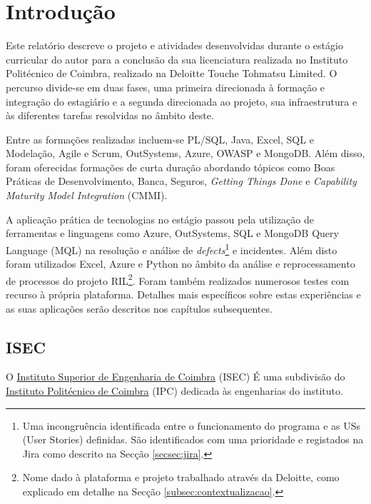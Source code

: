 \section{Introdução}\label{sec:introducao}

    Este relatório descreve o projeto e atividades desenvolvidas durante o estágio curricular do autor para a conclusão da sua licenciatura realizada no Instituto Politécnico de Coimbra, realizado na Deloitte Touche Tohmatsu Limited. O percurso divide-se em duas fases, uma primeira direcionada à formação e integração do estagiário e a segunda direcionada ao projeto, sua infraestrutura e às diferentes tarefas resolvidas no âmbito deste.

    Entre as formações realizadas incluem-se PL/SQL, Java, Excel, SQL e Modelação, Agile e Scrum, OutSystems, Azure, OWASP e MongoDB. Além disso, foram oferecidas formações de curta duração abordando tópicos como Boas Práticas de Desenvolvimento, Banca, Seguros, \textit{Getting Things Done} e \textit{Capability Maturity Model Integration} (CMMI).

    A aplicação prática de tecnologias no estágio passou pela utilização de ferramentas e linguagens como Azure, OutSystems, SQL e MongoDB Query Language (MQL) na resolução e análise de \textit{defects}\footnote{Uma incongruência identificada entre o funcionamento do programa e as USs (User Stories) definidas. São identificados com uma prioridade e registados na Jira como descrito na Secção \ref{secsec:jira}.} e incidentes. Além disto foram utilizados Excel, Azure e Python no âmbito da análise e reprocessamento de processos do projeto RIL\footnote{Nome dado à plataforma e projeto trabalhado através da Deloitte, como explicado em detalhe na Secção \ref{subsec:contextualizacao}.}. Foram também realizados numerosos testes com recurso à própria plataforma. Detalhes mais específicos sobre estas experiências e as suas aplicações serão descritos nos capítulos subsequentes.

    \subsection{ISEC}\label{subsec:isec}
    
        O \href{https://isec.pt/}{Instituto Superior de Engenharia de Coimbra} (ISEC) É uma subdivisão do \href{https://ipc.pt/}{Instituto Politécnico de Coimbra} (IPC) dedicada às engenharias do instituto.
    
